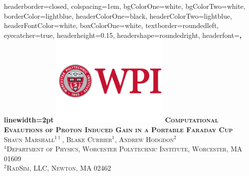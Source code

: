\documentclass[landscape,a0paper,fontscale=0.285]{baposter} %
\begin{document}
\begin{poster}
{
headerborder=closed, %
colspacing=1em, %
bgColorOne=white, %
bgColorTwo=white, %
borderColor=lightblue, %
headerColorOne=black, %
headerColorTwo=lightblue, %
headerFontColor=white, %
boxColorOne=white, %
textborder=roundedleft, %
eyecatcher=true, %
headerheight=0.15\textheight, %
headershape=roundedright, %
headerfont=\Large\bf\textsc, %
linewidth=2pt %
}
%
{\includegraphics[height=12em]{figures/Inst-Prim-FulClr.png}} %
{\bf\textsc{Computational Evalutions of Proton Induced Gain in a Portable Faraday Cup}\vspace{0.2em}} %
{\textsc{Shaun Marshall$^{1\dag}$, Blake Currier$^1$, Andrew Hodgdon$^2$ \\$^1$Department of Physics, Worcester Polytechnic Institute, Worcester, MA 01609\\ $^2$RadSim, LLC, Newton, MA 02462}} \\ %


\end{poster}
\end{document}

